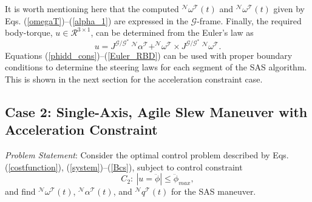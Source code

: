 \documentclass[letterpaper, paper,12pt]{AAS}		%
\begin{document}
It is worth mentioning here that the computed $^\mathcal{N}\omega^\mathcal{T}(t)$ and $^\mathcal{N}\omega^\mathcal{T}(t)$  given by Eqs. (\ref{omegaT})--(\ref{alpha_1}) are expressed in the $\mathcal{G}$-frame. Finally, the required body-torque, $u\in\mathcal{R}^{3\times 1}$, can be determined from the Euler's law as 
\begin{equation} \label{Euler_RBD}
u=J^{\mathcal{G/G^*}}\ ^\mathcal{N}\alpha^\mathcal{T} + ^\mathcal{N}\omega^\mathcal{T} \times J^{\mathcal{G/G^*}}\ ^\mathcal{N}\omega^\mathcal{T}.
\end{equation} 
%
%
%
%
%
Equations (\ref{phidd_cons})--(\ref{Euler_RBD}) can be used with proper boundary conditions to determine the steering laws for each segment of the SAS algorithm. This is shown in the next section for the acceleration constraint case.
	
	\subsection{Case 2: Single-Axis, Agile Slew Maneuver with Acceleration Constraint} 
	
	{\it Problem Statement}: Consider the optimal control problem described by Eqs. (\ref{costfunction}), (\ref{system})--(\ref{Bcs}), subject to control constraint
	\begin{equation}
	C_2: \ |u=\ddot{\phi}|\leq \ddot{\phi}_{max},
	\end{equation}
	and find $^\mathcal{N}\omega^\mathcal{T}(t)$, $^\mathcal{N}\alpha^\mathcal{T}(t)$, and $^\mathcal{N}q^\mathcal{T}(t)$ for the SAS maneuver.
	
\end{document}
